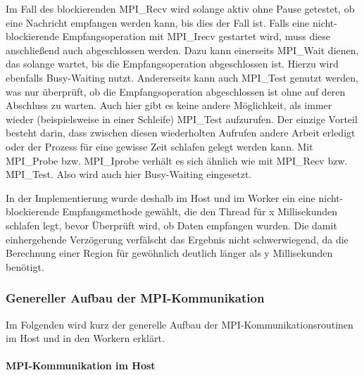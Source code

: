 Im Fall des blockierenden MPI\_Recv wird solange aktiv ohne Pause getestet, ob eine Nachricht empfangen werden kann, bis dies der Fall ist.
Falls eine nicht-blockierende Empfangsoperation mit MPI\_Irecv gestartet wird, muss diese anschließend auch abgeschlossen werden.
Dazu kann einerseits MPI\_Wait dienen, das solange wartet, bis die Empfangsoperation abgeschlossen ist. Hierzu wird ebenfalls Busy-Waiting nutzt.
Andererseits kann auch MPI\_Test genutzt werden, was nur überprüft, ob die Empfangsoperation abgeschlossen ist ohne auf deren Abschluss zu warten.
Auch hier gibt es keine andere Möglichkeit, als immer wieder (beispielsweise in einer Schleife) MPI\_Test aufzurufen.
Der einzige Vorteil besteht darin, dass zwischen diesen wiederholten Aufrufen andere Arbeit erledigt oder der Prozess für eine gewisse Zeit schlafen gelegt werden kann.
Mit MPI\_Probe bzw. MPI\_Iprobe verhält es sich ähnlich wie mit MPI\_Recv bzw. MPI\_Test.
Also wird auch hier Busy-Waiting eingesetzt.

In der Implementierung wurde deshalb im Host und im Worker ein eine nicht-blockierende Empfangsmethode gewählt, die den Thread für x Millisekunden schlafen legt, bevor Überprüft wird, ob Daten empfangen wurden.
Die damit einhergehende Verzögerung verfälscht das Ergebnis nicht schwerwiegend, da die Berechnung einer Region für gewöhnlich deutlich länger als y Millisekunden benötigt.

\subsubsection{Genereller Aufbau der MPI-Kommunikation}

Im Folgenden wird kurz der generelle Aufbau der MPI-Kommunikationsroutinen im Host und in den Workern erklärt.

\paragraph{MPI-Kommunikation im Host}\label{para:mpi_generell_host}


